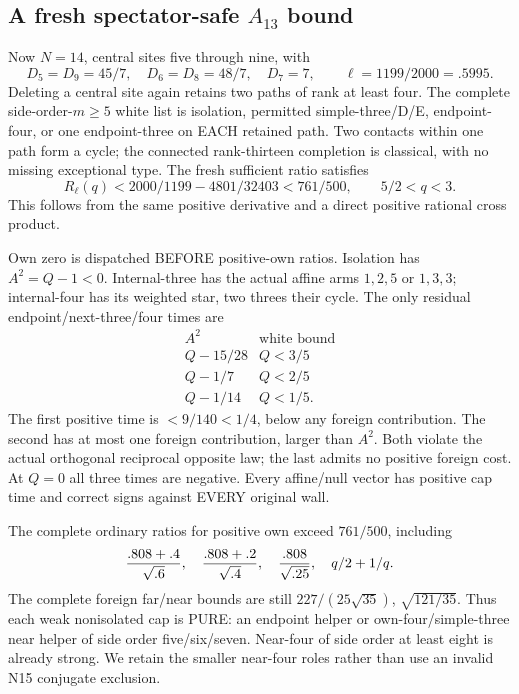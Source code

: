\documentclass[11pt]{article}
\begin{document}
\subsection{A fresh spectator-safe \(A_{13}\) bound}
\label{app:arithA13universal}

Now \(N=14\), central sites five through nine,
with
\[
 D_5=D_9=45/7,\quad D_6=D_8=48/7,\quad D_7=7,\qquad
 \ell=1199/2000=.5995 .
\]
Deleting a central site again retains two
paths of rank at least four.
The complete side-order-\(m\ge5\) white list
is isolation, permitted simple-three/D/E,
endpoint-four, or one endpoint-three on EACH
retained path.
Two contacts within one path form a cycle;
the connected rank-thirteen completion is
classical, with no missing exceptional type.
The fresh sufficient ratio satisfies
\[
 R_\ell(q)<2000/1199-4801/32403<761/500,\qquad 5/2<q<3 .
\]
This follows from the same positive derivative
and a direct positive rational cross product.

Own zero is dispatched BEFORE positive-own
ratios.
Isolation has \(A^2=Q-1<0\).
Internal-three has the actual affine arms
\(1,2,5\) or \(1,3,3\); internal-four has its
weighted star, two threes their cycle.
The only residual endpoint/next-three/four
times are
\[
 \begin{array}{c|c}
 A^2&\text{white bound}\\ \hline
 Q-15/28&Q<3/5\\
 Q-1/7&Q<2/5\\
 Q-1/14&Q<1/5 .
 \end{array}
\]
The first positive time is \(<9/140<1/4\),
below any foreign contribution.
The second has at most one foreign contribution,
larger than \(A^2\).
Both violate the actual orthogonal reciprocal
opposite law; the last admits no positive
foreign cost.
At \(Q=0\) all three times are negative.
Every affine/null vector has positive cap time
and correct signs against EVERY original wall.

The complete ordinary ratios for positive own
exceed \(761/500\), including
\[
 { .808+.4\over\sqrt{.6}},\quad
 { .808+.2\over\sqrt{.4}},\quad
 { .808\over\sqrt{.25}},\quad q/2+1/q .
\]
The complete foreign far/near bounds are still
\(227/(25\sqrt{35})\), \(\sqrt{121/35}\).
Thus each weak nonisolated cap is PURE:
an endpoint helper or own-four/simple-three
near helper of side order five/six/seven.
Near-four of side order at least eight is
already strong.
We retain the smaller near-four roles rather
than use an invalid N15 conjugate exclusion.
\end{document}
